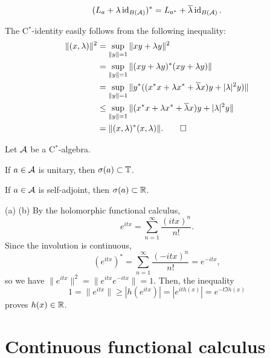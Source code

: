 \documentclass{../note}
\begin{document}
\begin{prb}
\[(L_a+\lambda\id_{B(\cA)})^*=L_{a^*}+\bar\lambda\id_{B(\cA)}.\]
\end{prb}
\begin{pf}
The C$^*$-identity easily follows from the following inequality:
\begin{align*}
\|(x,\lambda)\|^2&=\sup_{\|y\|=1}\|xy+\lambda y\|^2\\
&=\sup_{\|y\|=1}\|(xy+\lambda y)^*(xy+\lambda y)\|\\
&=\sup_{\|y\|=1}\|y^*((x^*x+\lambda x^*+\bar\lambda x)y+|\lambda|^2y)\|\\
&\le\sup_{\|y\|=1}\|(x^*x+\lambda x^*+\bar\lambda x)y+|\lambda|^2y\|\\
&=\|(x,\lambda)^*(x,\lambda)\|.\qedhere
\end{align*}
\end{pf}


\begin{prb}
Let $\cA$ be a C$^*$-algebra.
\begin{parts}
\item If $a\in\cA$ is unitary, then $\sigma(a)\subset\T$.
\item If $a\in\cA$ is self-adjoint, then $\sigma(a)\subset\R$.
\end{parts}
\end{prb}
\begin{pf}
(a) (b)
By the holomorphic functional calculus,
\[e^{itx}=\sum_{n=1}^\infty\frac{(itx)^n}{n!}.\]
Since the involution is continuous,
\[(e^{itx})^*=\sum_{n=1}^\infty\frac{(-itx)^n}{n!}=e^{-itx},\]
so we have $\|e^{itx}\|^2=\|e^{itx}e^{-itx}\|=1$.
Then, the inequality
\[1=\|e^{itx}\|\ge|h(e^{itx})|=|e^{ith(x)}|=e^{-t\Im h(x)}\]
proves $h(x)\in\R$.

\end{pf}



\section{Continuous functional calculus}
\end{document}
